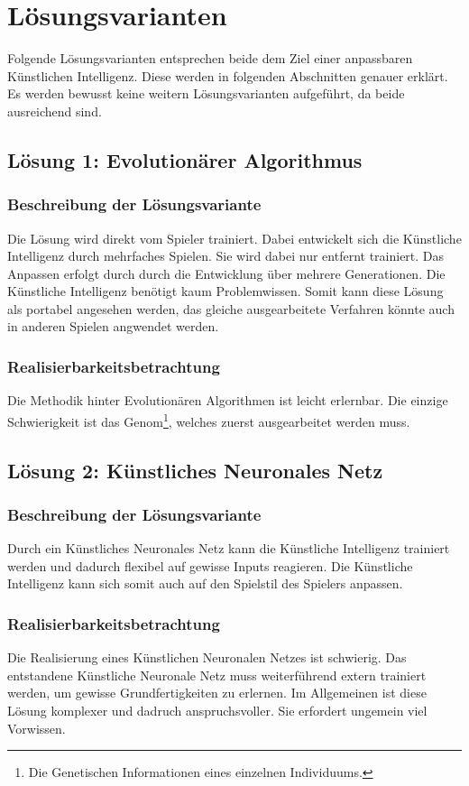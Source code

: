 \section{Lösungsvarianten}
Folgende Lösungsvarianten entsprechen beide dem Ziel einer anpassbaren Künstlichen Intelligenz. Diese werden in folgenden Abschnitten genauer
erklärt. Es werden bewusst keine weitern Lösungsvarianten aufgeführt, da beide ausreichend sind.
\subsection{Lösung 1: Evolutionärer Algorithmus}
\subsubsection{Beschreibung der Lösungsvariante}
Die Lösung wird direkt vom Spieler trainiert. Dabei entwickelt sich die Künstliche Intelligenz durch mehrfaches Spielen. Sie wird dabei nur entfernt trainiert. Das Anpassen erfolgt durch durch die Entwicklung über mehrere Generationen. Die Künstliche Intelligenz benötigt kaum Problemwissen. Somit kann diese Lösung als portabel angesehen werden, das gleiche ausgearbeitete Verfahren könnte auch in anderen Spielen angwendet werden.
\subsubsection{Realisierbarkeitsbetrachtung}
Die Methodik hinter Evolutionären Algorithmen ist leicht erlernbar. Die einzige Schwierigkeit ist das Genom\footnote{Die Genetischen Informationen eines einzelnen Individuums.}, welches zuerst ausgearbeitet werden muss.
\subsection{Lösung 2: Künstliches Neuronales Netz}
\subsubsection{Beschreibung der Lösungsvariante}
Durch ein Künstliches Neuronales Netz kann die Künstliche Intelligenz trainiert werden und dadurch flexibel auf gewisse Inputs reagieren. Die Künstliche Intelligenz kann sich somit auch auf den Spielstil des Spielers anpassen.
\subsubsection{Realisierbarkeitsbetrachtung}
Die Realisierung eines Künstlichen Neuronalen Netzes ist schwierig. Das entstandene Künstliche Neuronale Netz muss weiterführend extern trainiert werden, um gewisse Grundfertigkeiten zu erlernen. Im Allgemeinen ist diese Lösung komplexer und dadruch anspruchsvoller. Sie erfordert ungemein viel Vorwissen.